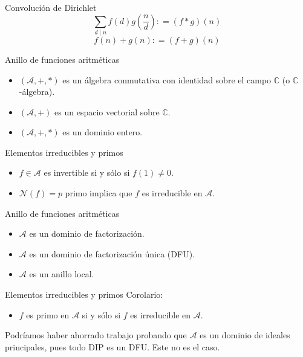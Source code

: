 \documentclass{beamer}
\begin{document}
\begin{frame}{Convolución de Dirichlet}
    \begin{equation*}
        \sum_{d \mid n} f(d) g \left( \frac{n}{d} \right) : = (f * g)(n)
    \end{equation*}
    \begin{equation*}
         f(n) + g(n) : = (f + g)(n)
    \end{equation*}
\end{frame}

\begin{frame}{Anillo de funciones aritméticas}
    \begin{itemize}
    \item $(\mathcal{A},+,*)$ es un álgebra conmutativa con identidad sobre el campo $\mathbb{C}$ (o $\mathbb{C}$-álgebra).
    \item $(\mathcal{A},+)$ es un espacio vectorial sobre $\mathbb{C}$.
    \item $(\mathcal{A},+,*)$ es un dominio entero.
    \end{itemize}
\end{frame}

\begin{frame}{Elementos irreducibles y primos}
    \begin{itemize}
    \item $f \in \mathcal{A}$ es invertible si y sólo si $f(1) \ne 0$.
    \item $\mathcal{N}(f) = p$ primo implica que $f$ es irreducible en $\mathcal{A}$.
    \end{itemize}
\end{frame}

\begin{frame}{Anillo de funciones aritméticas}
    \begin{itemize}
    \item $\mathcal{A}$ es un dominio de factorización.
    \item $\mathcal{A}$ es un dominio de factorización única (DFU).
    \item $\mathcal{A}$ es un anillo local.
    \end{itemize}
\end{frame}

\begin{frame}{Elementos irreducibles y primos}
    Corolario:
    \begin{itemize}
    \item $f$ es primo en $\mathcal{A}$ si y sólo si $f$ es irreducible en $\mathcal{A}$.
    \end{itemize}
    Podríamos haber ahorrado trabajo probando que $\mathcal{A}$ es un dominio de ideales principales, pues todo DIP es un DFU. Este no es el caso.
\end{frame}
\end{document}
